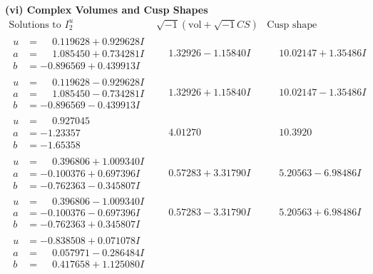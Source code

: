 \documentclass[1p]{elsarticle_modified}
\theoremstyle{definition}
\newcommand{\I}{\sqrt{-1}}
\begin{document}
\newpage\flushleft \textbf{(vi) Complex Volumes and Cusp Shapes}
$$\begin{array}{c|c|c}  
\text{Solutions to }I^u_{2}& \I (\text{vol} + \sqrt{-1}CS) & \text{Cusp shape}\\
 \hline 
\begin{aligned}
u &= \phantom{-}0.119628 + 0.929628 I \\
a &= \phantom{-}1.085450 + 0.734281 I \\
b &= -0.896569 + 0.439913 I\end{aligned}
 & \phantom{-}1.32926 - 1.15840 I & \phantom{-}10.02147 + 1.35486 I \\ \hline\begin{aligned}
u &= \phantom{-}0.119628 - 0.929628 I \\
a &= \phantom{-}1.085450 - 0.734281 I \\
b &= -0.896569 - 0.439913 I\end{aligned}
 & \phantom{-}1.32926 + 1.15840 I & \phantom{-}10.02147 - 1.35486 I \\ \hline\begin{aligned}
u &= \phantom{-}0.927045\phantom{ +0.000000I} \\
a &= -1.23357\phantom{ +0.000000I} \\
b &= -1.65358\phantom{ +0.000000I}\end{aligned}
 & \phantom{-}4.01270\phantom{ +0.000000I} & \phantom{-}10.3920\phantom{ +0.000000I} \\ \hline\begin{aligned}
u &= \phantom{-}0.396806 + 1.009340 I \\
a &= -0.100376 + 0.697396 I \\
b &= -0.762363 - 0.345807 I\end{aligned}
 & \phantom{-}0.57283 + 3.31790 I & \phantom{-}5.20563 - 6.98486 I \\ \hline\begin{aligned}
u &= \phantom{-}0.396806 - 1.009340 I \\
a &= -0.100376 - 0.697396 I \\
b &= -0.762363 + 0.345807 I\end{aligned}
 & \phantom{-}0.57283 - 3.31790 I & \phantom{-}5.20563 + 6.98486 I \\ \hline\begin{aligned}
u &= -0.838508 + 0.071078 I \\
a &= \phantom{-}0.057971 - 0.286484 I \\
b &= \phantom{-}0.417658 + 1.125080 I\end{aligned}

\end{array}$$
\end{document}
